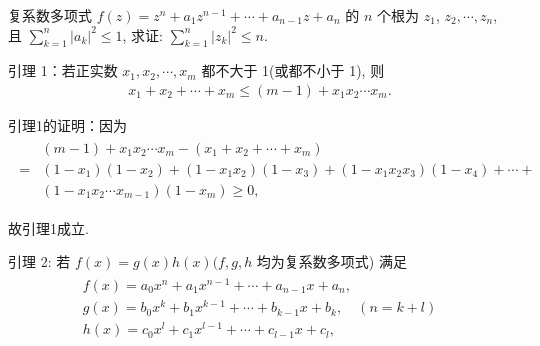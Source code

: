 \begin{example}
	复系数多项式 $f(z)=z^n+a_1 z^{n-1}+\cdots+a_{n-1} z+a_n$ 的 $n$ 个根为 $z_1$, $z_2, \cdots, z_n$, 且 $\sum_{k=1}^n\left|a_k\right|^2 \leqslant 1$, 求证: $\sum_{k=1}^n\left|z_k\right|^2 \leqslant n$.
\end{example}
\begin{solution}
	引理 1：若正实数 $x_1, x_2, \cdots, x_m$ 都不大于 1(或都不小于 1), 则
	\begin{align*}
		x_1+x_2+\cdots+x_m \leqslant(m-1)+x_1 x_2 \cdots x_m .
	\end{align*}

	引理1的证明：因为
	\begin{align*}
		\begin{aligned}
			  & (m-1)+x_1 x_2 \cdots x_m-\left(x_1+x_2+\cdots+x_m\right)                                                                           \\
			= & \left(1-x_1\right)\left(1-x_2\right)+\left(1-x_1 x_2\right)\left(1-x_3\right)+\left(1-x_1 x_2 x_3\right)\left(1-x_4\right)+\cdots+ \\
			  & \left(1-x_1 x_2 \cdots x_{m-1}\right)\left(1-x_m\right) \geqslant 0,
		\end{aligned}
	\end{align*}

	故引理1成立.


	引理 2: 若 $f(x)=g(x) h(x)(f, g, h$ 均为复系数多项式) 满足
	\begin{align*}
		\begin{gathered}
			f(x)=a_0 x^n+a_1 x^{n-1}+\cdots+a_{n-1} x+a_n, \\
			g(x)=b_0 x^k+b_1 x^{k-1}+\cdots+b_{k-1} x+b_k, \quad(n=k+l) \\
			h(x)=c_0 x^l+c_1 x^{l-1}+\cdots+c_{l-1} x+c_l,
		\end{gathered}
	\end{align*}


\end{solution}
